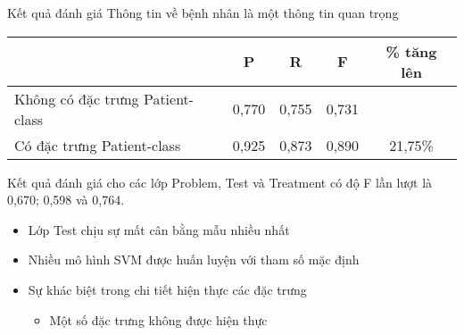 \begin{frame}{Kết quả đánh giá}
Thông tin về bệnh nhân là một thông tin quan trọng
\begin{center}
	\renewcommand{\tabcolsep}{3pt}
	\footnotesize\sffamily
	
	\begin{tabular}{@{}lcccc@{}}
	\toprule
	& \textbf{P} & \textbf{R} & \textbf{F} & \% tăng lên\\
	\midrule
	Không có đặc trưng Patient-class & 0,770 & 0,755 & 0,731 &\\
	Có đặc trưng Patient-class & 0,925 & 0,873 & 0,890 & 21,75\%\\
	\bottomrule
	\end{tabular}
\end{center}

Kết quả đánh giá cho các lớp Problem, Test và Treatment có độ F lần lượt là 0,670; 0,598 và 0,764.
\begin{itemize}
	\item Lớp Test chịu sự mất cân bằng mẫu nhiều nhất
	\item Nhiều mô hình SVM được huấn luyện với tham số mặc định
	\item Sự khác biệt trong chi tiết hiện thực các đặc trưng
	\begin{itemize}
		\item Một số đặc trưng không được hiện thực
	\end{itemize}
\end{itemize}
\end{frame}
